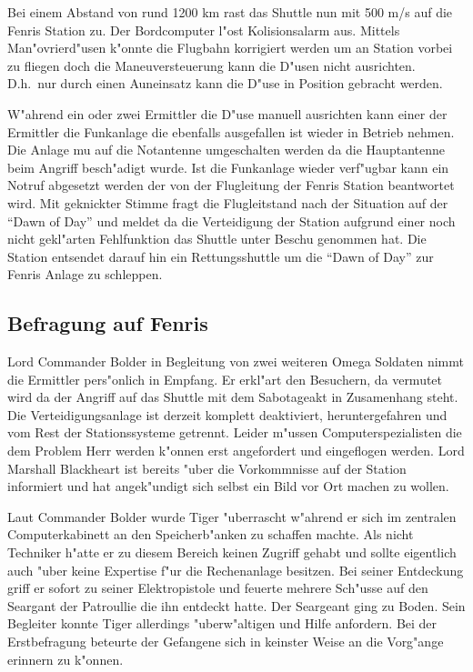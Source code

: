 Bei einem Abstand von rund 1200 km rast das Shuttle nun mit 500 m/s auf die Fenris Station zu. Der Bordcomputer l"ost Kolisionsalarm aus. Mittels Man"ovrierd"usen k"onnte die Flugbahn korrigiert werden um an Station vorbei zu fliegen doch die Maneuversteuerung kann die D"usen nicht ausrichten. D.h.~nur durch einen Au\3neinsatz kann die D"use in Position gebracht werden.

W"ahrend ein oder zwei Ermittler die D"use manuell ausrichten kann einer der Ermittler die Funkanlage die ebenfalls ausgefallen ist wieder in Betrieb nehmen. Die Anlage mu\3 auf die Notantenne umgeschalten werden da die Hauptantenne beim Angriff besch"adigt wurde. Ist die Funkanlage wieder verf"ugbar kann ein Notruf abgesetzt werden der von der Flugleitung der Fenris Station beantwortet wird. Mit geknickter Stimme fragt die Flugleitstand nach der Situation auf der ``Dawn of Day'' und meldet da\3 die Verteidigung der Station aufgrund einer noch nicht gekl"arten Fehlfunktion das Shuttle unter Beschu\3 genommen hat. Die Station entsendet darauf hin ein Rettungsshuttle um die ``Dawn of Day'' zur Fenris Anlage zu schleppen.

\subsection{Befragung auf Fenris}

Lord Commander Bolder in Begleitung von zwei weiteren Omega Soldaten nimmt die Ermittler pers"onlich in Empfang. Er erkl"art den Besuchern, da\3 vermutet wird da\3 der Angriff auf das Shuttle mit dem Sabotageakt in Zusamenhang steht. Die Verteidigungsanlage ist derzeit komplett deaktiviert, heruntergefahren und vom Rest der Stationssysteme getrennt. Leider m"ussen Computerspezialisten die dem Problem Herr werden k"onnen erst angefordert und eingeflogen werden. Lord Marshall Blackheart ist bereits "uber die Vorkommnisse auf der Station informiert und hat angek"undigt sich selbst ein Bild vor Ort machen zu wollen.

Laut Commander Bolder wurde Tiger "uberrascht w"ahrend er sich im zentralen Computerkabinett an den Speicherb"anken zu schaffen machte. Als nicht Techniker h"atte er zu diesem Bereich keinen Zugriff gehabt und sollte eigentlich auch "uber keine Expertise f"ur die Rechenanlage besitzen. Bei seiner Entdeckung griff er sofort zu seiner Elektropistole und feuerte mehrere Sch"usse auf den Seargant der Patroullie die ihn entdeckt hatte. Der Seargeant ging zu Boden. Sein Begleiter konnte Tiger allerdings "uberw"altigen und Hilfe anfordern. Bei der Erstbefragung beteurte der Gefangene sich in keinster Weise an die Vorg"ange erinnern zu k"onnen.

